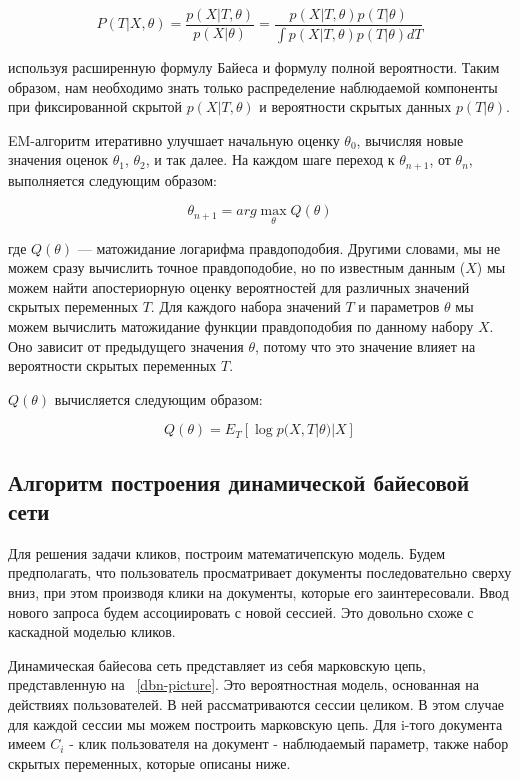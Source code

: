 \begin{equation}
	P(T|X,\theta)=\frac{p(X|T,\theta)}{p(X|\theta)}=\frac{p(X|T,\theta)p(T|\theta)}{\int p(X|T,\theta)p(T|\theta)dT}
\end{equation}
\par
используя расширенную формулу Байеса и формулу полной вероятности. Таким образом, нам необходимо знать только распределение наблюдаемой компоненты при фиксированной скрытой $p(X|T,\theta)$ и вероятности скрытых данных $p(T|\theta)$.

EM-алгоритм итеративно улучшает начальную оценку $\theta_0$, вычисляя новые значения оценок $\theta_1$, $\theta_2$, и так далее. На каждом шаге переход к $\theta_{n+1}$, от $\theta_n$, выполняется следующим образом:

\begin{equation}
	\theta_{n+1}=arg \max_{\theta} Q(\theta)
\end{equation}
\par
где $Q(\theta)$ — матожидание логарифма правдоподобия. Другими словами, мы не можем сразу вычислить точное правдоподобие, но по известным данным ($X$) мы можем найти апостериорную оценку вероятностей для различных значений скрытых переменных $T$. Для каждого набора значений $T$ и параметров $\theta$ мы можем вычислить матожидание функции правдоподобия по данному набору $X$. Оно зависит от предыдущего значения $\theta$, потому что это значение влияет на вероятности скрытых переменных $T$.

$Q(\theta)$ вычисляется следующим образом:

\begin{equation}
	Q(\theta) = E_T[\log p(X,T|\theta)|X]
\end{equation}


\subsection{Алгоритм построения динамической байесовой сети}

Для решения задачи кликов, построим математичепскую модель. Будем предполагать, что пользователь просматривает документы последовательно сверху вниз, при этом производя клики на документы, которые его заинтересовали. Ввод нового запроса будем ассоциировать с новой сессией. Это довольно схоже с каскадной моделью кликов.~\cite{cascade_click_book}

Динамическая байесова сеть представляет из себя марковскую цепь, представленную на ~\ref{dbn-picture}. Это вероятностная модель, основанная на действиях пользователей. В ней рассматриваются сессии целиком. В этом случае для каждой сессии мы можем построить марковскую цепь. Для i-того документа имеем $C_i$ - клик пользователя на документ - наблюдаемый параметр, также набор скрытых переменных, которые описаны ниже.	

